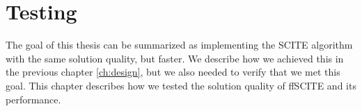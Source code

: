 \chapter{Testing}
\label{ch:testing}

The goal of this thesis can be summarized as implementing the \ac{SCITE} algorithm with the same solution quality, but faster. We describe how we achieved this in the previous chapter \ref{ch:design}, but we also needed to verify that we met this goal. This chapter describes how we tested the solution quality of \ac{ffSCITE} and its performance.



